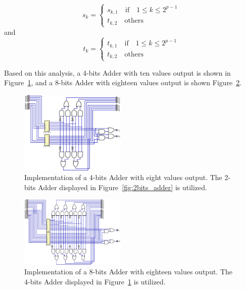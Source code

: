 \documentclass[conference]{IEEEtran}
\begin{document}
\begin{itemize}
    \begin{equation}
        s_k = \begin{cases}
            s_{k,1} \quad \text{if} \quad 1 \leq k \leq 2^{p-1} \\
            t_{k,2} \quad \text{others}
        \end{cases}
    \end{equation}
    and
    \begin{equation}
        t_k = \begin{cases}
            t_{k,1} \quad \text{if} \quad 1 \leq k \leq 2^{p-1} \\
            t_{k,2} \quad \text{others}
        \end{cases}
    \end{equation} 
\end{itemize}

Based on this analysis, a 4-bits Adder with ten values output is shown in Figure~\ref{fig:4bits_adder}, and a 8-bits Adder with eighteen values output is shown Figure~\ref{fig:8bits_adder}.


\begin{figure}[h!]
\centering
\includegraphics[width=0.45\textwidth]{assets/4bits_adder.png}
\caption{Implementation of a 4-bits Adder with eight values output. The 2-bits Adder displayed in Figure~\ref{fig:2bits_adder} is utilized.}
\label{fig:4bits_adder}
\end{figure}

\begin{figure}[h!]
\centering
\includegraphics[width=0.45\textwidth]{assets/8bits_adder.png}
\caption{Implementation of a 8-bits Adder with eighteen values output. The 4-bits Adder displayed in Figure~\ref{fig:4bits_adder} is utilized.}
\label{fig:8bits_adder}
\end{figure}
\end{document}
